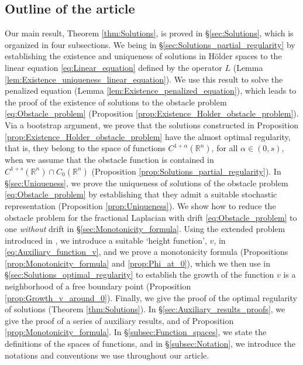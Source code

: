 \documentclass[11pt,reqno]{amsart}
\theoremstyle{definition}
\theoremstyle{remark}
\begin{document}
\subsection{Outline of the article}
\label{subsec:Outline}
Our main result, Theorem \ref{thm:Solutions}, is proved in \S \ref{sec:Solutions}, which is organized in 
four subsections. We being in \S \ref{sec:Solutions_partial_regularity} by establishing the existence and uniqueness of solutions in H\"older spaces to the linear equation \eqref{eq:Linear_equation} defined by the operator $L$ (Lemma \ref{lem:Existence_uniqueness_linear_equation}). We use this result to solve the penalized equation (Lemma \ref{lem:Existence_penalized_equation}), which leads to the proof of the existence of solutions to the obstacle problem \eqref{eq:Obstacle_problem} (Proposition \ref{prop:Existence_Holder_obstacle_problem}). Via a bootstrap argument, we prove that the solutions constructed in Proposition \ref{prop:Existence_Holder_obstacle_problem} have the almost optimal regularity, that is, they belong to the space of functions $C^{1+\alpha}({\mathbb{R}}^n)$, for all $\alpha\in(0,s)$, when we assume that the obstacle function is contained in $C^{1+s}({\mathbb{R}}^n)\cap C_0({\mathbb{R}}^n)$ (Proposition \ref{prop:Solutions_partial_regularity}). In \S \ref{sec:Uniqueness}, we prove the uniqueness of solutions of the obstacle problem \eqref{eq:Obstacle_problem} by establishing that they admit a suitable stochastic representation (Proposition \ref{prop:Uniqueness}). We show how to reduce the obstacle problem for the fractional Laplacian with drift \eqref{eq:Obstacle_problem} to one \emph{without} drift in \S \ref{sec:Monotonicity_formula}. Using the extended problem introduced in \cite{Caffarelli_Silvestre_2007}, we introduce a suitable `height function', $v$, in \eqref{eq:Auxiliary_function_v}, and we prove a monotonicity formula (Propositions \ref{prop:Monotonicity_formula} and \ref{prop:Phi_at_0}), which we then use in \S \ref{sec:Solutions_optimal_regularity} to establish the growth of the function $v$ is a neighborhood of a free boundary point (Proposition \ref{prop:Growth_v_around_0}). Finally, we give the proof of the optimal regularity of solutions (Theorem \ref{thm:Solutions}). In \S \ref{sec:Auxiliary_results_proofs}, we give the proof of a series of auxiliary results, and of Proposition \ref{prop:Monotonicity_formula}. In \S \ref{subsec:Function_spaces}, we state the definitions of the spaces of functions, and in \S \ref{subsec:Notation}, we introduce the notations and conventions we use throughout our article.
\end{document}
